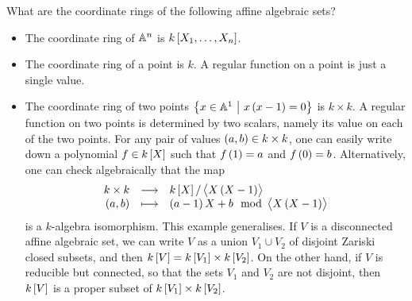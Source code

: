 \begin{example*}
What are the coordinate rings of the following affine algebraic sets?
\begin{itemize}
\item The coordinate ring of $ \AA^n $ is $ k\sbr{X_1, \dots, X_n} $.
\item The coordinate ring of a point is $ k $. A regular function on a point is just a single value.
\item The coordinate ring of two points $ \cbr{x \in \AA^1 \st x\br{x - 1} = 0} $ is $ k \times k $. A regular function on two points is determined by two scalars, namely its value on each of the two points. For any pair of values $ \br{a, b} \in k \times k $, one can easily write down a polynomial $ f \in k\sbr{X} $ such that $ f\br{1} = a $ and $ f\br{0} = b $. Alternatively, one can check algebraically that the map
$$ \function{k \times k}{k\sbr{X} / \abr{X\br{X - 1}}}{\br{a, b}}{\br{a - 1}X + b \mod \abr{X\br{X - 1}}} $$
is a $ k $-algebra isomorphism. This example generalises. If $ V $ is a disconnected affine algebraic set, we can write $ V $ as a union $ V_1 \cup V_2 $ of disjoint Zariski closed subsets, and then $ k\sbr{V} = k\sbr{V_1} \times k\sbr{V_2} $. On the other hand, if $ V $ is reducible but connected, so that the sets $ V_1 $ and $ V_2 $ are not disjoint, then $ k\sbr{V} $ is a proper subset of $ k\sbr{V_1} \times k\sbr{V_2} $.

\pagebreak


\end{itemize}
\end{example*}
